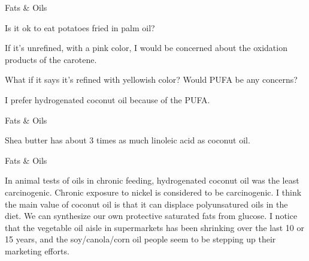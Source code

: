 \documentclass[11pt,oneside,openany,extrafontsizes]{memoir}
\begin{document}
\begin{emailexchange}{Fats \& Oils}

    \begin{question}
        Is it ok to eat potatoes fried in palm oil?
    \end{question}

    \begin{answer}
      If it's unrefined, with a pink color, I would be concerned about the oxidation products of the carotene.
    \end{answer}

    \begin{question}
        What if it says it's refined with yellowish color? Would PUFA be any concerns?
    \end{question}

    \begin{answer}
      I prefer hydrogenated coconut oil because of the PUFA.
    \end{answer}
\end{emailexchange}

\begin{standalonequote}{Fats \& Oils}

    \begin{answer}
      Shea butter has about 3 times as much linoleic acid as coconut oil.
    \end{answer}
\end{standalonequote}

\begin{standalonequote}{Fats \& Oils}

    \begin{answer}
      In animal tests of oils in chronic feeding, hydrogenated coconut oil was the least carcinogenic. Chronic exposure to nickel is considered to be carcinogenic. I think the main value of coconut oil is that it can displace polyunsatured oils in the diet. We can synthesize our own protective saturated fats from glucose. I notice that the vegetable oil aisle in supermarkets has been shrinking over the last 10 or 15 years, and the soy/canola/corn oil people seem to be stepping up their marketing efforts.
    \end{answer}
\end{standalonequote}
\end{document}
